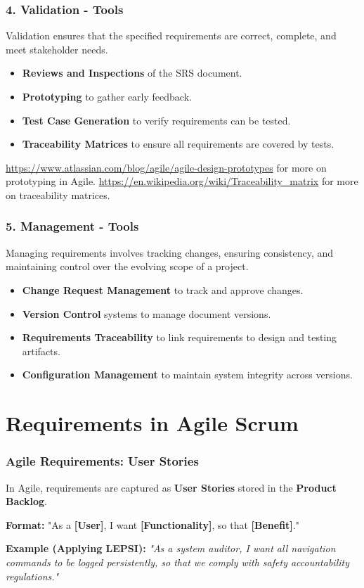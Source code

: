\documentclass[xcolor=table]{beamer}
\begin{document}
\begin{frame}
    \frametitle{4. Validation - Tools}
    Validation ensures that the specified requirements are correct, complete, and meet stakeholder needs.
    \begin{itemize}
        \item \textbf{Reviews and Inspections} of the SRS document.
        \item \textbf{Prototyping} to gather early feedback.
        \item \textbf{Test Case Generation} to verify requirements can be tested.
        \item \textbf{Traceability Matrices} to ensure all requirements are covered by tests.
    \end{itemize}

    \vspace{0.5cm}
    \footnotesize \url{https://www.atlassian.com/blog/agile/agile-design-prototypes} for more on prototyping in Agile.
    \url{https://en.wikipedia.org/wiki/Traceability_matrix} for more on traceability matrices.
\end{frame}

\begin{frame}
    \frametitle{5. Management - Tools}
    Managing requirements involves tracking changes, ensuring consistency, and maintaining control over the evolving scope of a project.
    \begin{itemize}
        \item \textbf{Change Request Management} to track and approve changes.
        \item \textbf{Version Control} systems to manage document versions.
        \item \textbf{Requirements Traceability} to link requirements to design and testing artifacts.
        \item \textbf{Configuration Management} to maintain system integrity across versions.
    \end{itemize}
\end{frame}


\section{Requirements in Agile Scrum}

\begin{frame}
    \frametitle{Agile Requirements: User Stories}
    In Agile, requirements are captured as \textbf{User Stories} stored in the \textbf{Product Backlog}.
    
    \vspace{0.5cm}
    \textbf{Format:}
    "As a \textbf{[User]}, I want \textbf{[Functionality]}, so that \textbf{[Benefit]}."
    
    \vspace{0.5cm}
    \textbf{Example (Applying LEPSI):}
    \textit{"As a system auditor, I want all navigation commands to be logged persistently, so that we comply with safety accountability regulations."}
\end{frame}
\end{document}
